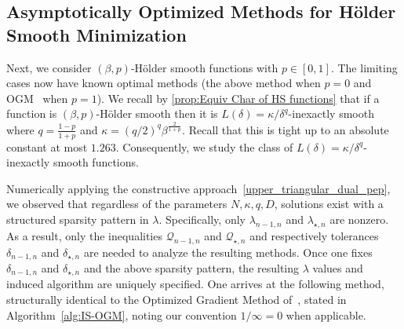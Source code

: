 \documentclass[11pt, hidelinks]{article}
\numberwithin{equation}{section}
\theoremstyle{thmstyletwo}%
\numberwithin{equation}{section}
\newcommand{\Holder}{H\"older }
\begin{document}
\subsection{Asymptotically Optimized Methods for \Holder Smooth Minimization}\label{subsec:asymptotic_OGM}
Next, we consider $(\beta,p)$-\Holder smooth functions with $p\in[0,1]$. The limiting cases now have known optimal methods (the above method when $p=0$ and OGM~\cite{kim2016optimized} when $p=1$). We recall by \cref{prop:Equiv Char of HS functions} that if a function is $(\beta,p)$-\Holder smooth then it is $L(\delta) = \kappa/\delta^q$-inexactly smooth where $q = \frac{1-p}{1+p}$ and $\kappa = (q/2)^q \beta^{\frac{2}{1+p}}$. Recall that this is tight up to an absolute constant at most $1.263$. Consequently, we study the class of $L(\delta) = \kappa/\delta^q$-inexactly smooth functions. 

Numerically applying the constructive approach~\eqref{upper_triangular_dual_pep}, we observed that regardless of the parameters $N, \kappa, q, D$, solutions exist with a structured sparsity pattern in $\lambda$. Specifically, only $\lambda_{n-1,n}$ and $\lambda_{\star, n}$ are nonzero. As a result, only the inequalities $\mathcal{Q}_{n-1,n}$ and $\mathcal{Q}_{\star,n}$ and respectively tolerances $\delta_{n-1,n}$ and $\delta_{\star,n}$ are needed to analyze the resulting methods. Once one fixes $\delta_{n-1, n}$ and $\delta_{\star,n}$ and the above sparsity pattern, the resulting $\lambda$ values and induced algorithm are uniquely specified. One arrives at the following method, structurally identical to the Optimized Gradient Method of~\cite{kim2016optimized}, stated in Algorithm~\ref{alg:IS-OGM}, noting our convention $1/\infty = 0$ when applicable.  

\end{document}
